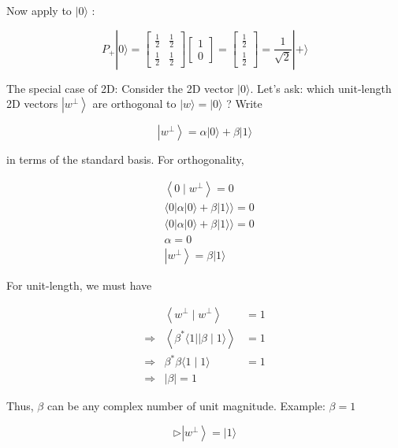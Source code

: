 \documentclass[main.tex]{subfiles}
\begin{document}
    Now apply to $|0\rangle$ :
    
    $$
    P_{+}|0\rangle=\left[\begin{array}{ll}
    \frac{1}{2} & \frac{1}{2} \\
    \frac{1}{2} & \frac{1}{2}
    \end{array}\right]\left[\begin{array}{l}
    1 \\
    0
    \end{array}\right]=\left[\begin{array}{c}
    \frac{1}{2} \\
    \frac{1}{2}
    \end{array}\right]=\frac{1}{\sqrt{2}}|+\rangle
    $$

    The special case of 2D: Consider the 2D vector $|0\rangle$. Let's ask: which unit-length 2D vectors $\left|w^{\perp}\right\rangle$ are orthogonal to $|w\rangle=|0\rangle$ ? Write
    
    $$
    \left|w^{\perp}\right\rangle=\alpha|0\rangle+\beta|1\rangle
    $$
    
    in terms of the standard basis. For orthogonality,
    
    $$
    \begin{aligned}
    &\left\langle 0 \mid w^{\perp}\right\rangle=0 \\
    &\langle 0|\alpha| 0\rangle+\beta|1\rangle\rangle=0 \\
    &\langle 0|\alpha| 0\rangle+\beta|1\rangle\rangle=0 \\
    &\alpha=0 \\
    &\left|w^{\perp}\right\rangle=\beta|1\rangle
    \end{aligned}
    $$
    
    For unit-length, we must have
    
    $$
    \begin{array}{lcl} 
    & \left\langle w^{\perp} \mid w^{\perp}\right\rangle & =1 \\
    \Rightarrow & \left\langle\beta^{*}\langle 1|| \beta \mid 1\rangle\right\rangle & =1 \\
    \Rightarrow & \beta^{*} \beta\langle 1 \mid 1\rangle & =1 \\
    \Rightarrow & |\beta|=1 &
    \end{array}
    $$
    
    Thus, $\beta$ can be any complex number of unit magnitude. Example: $\beta=1$
    
    $$
    \triangleright\left|w^{\perp}\right\rangle=|1\rangle
    $$
    
\end{document}
